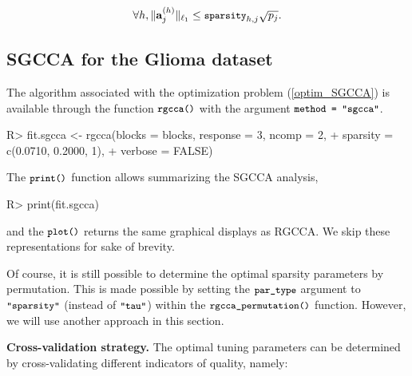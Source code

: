 \documentclass[
]{jss}
\begin{document}
\begin{equation}
\forall h, \Vert \mathbf{a}_j^{(h)} \Vert_{\ell_1} \leq \small{\texttt{sparsity}}_{h,j} \sqrt{p_j}.
\end{equation}

\hypertarget{sgcca-for-the-glioma-dataset}{%
\subsection{SGCCA for the Glioma
dataset}\label{sgcca-for-the-glioma-dataset}}

The algorithm associated with the optimization problem
(\ref{optim_SGCCA}) is available through the function
\(\small{\texttt{rgcca()}}\) with the argument
\(\small{\texttt{method = "sgcca"}}\).

\footnotesize

\begin{CodeChunk}
\begin{CodeInput}
R> fit.sgcca <- rgcca(blocks = blocks, response = 3, ncomp = 2,
+                    sparsity = c(0.0710, 0.2000, 1),
+                    verbose = FALSE)
\end{CodeInput}
\end{CodeChunk}

\normalsize

The \(\small{\texttt{print()}}\) function allows summarizing the SGCCA
analysis,

\footnotesize

\begin{CodeChunk}
\begin{CodeInput}
R> print(fit.sgcca)
\end{CodeInput}
\end{CodeChunk}

\normalsize

and the \(\small{\texttt{plot()}}\) returns the same graphical displays
as RGCCA. We skip these representations for sake of brevity.

Of course, it is still possible to determine the optimal sparsity
parameters by permutation. This is made possible by setting the
\(\small{\texttt{par\_type}}\) argument to
\(\small{\texttt{"sparsity"}}\) (instead of \(\small{\texttt{"tau"}}\))
within the \(\small{\texttt{rgcca\_permutation()}}\) function. However,
we will use another approach in this section.

\textbf{Cross-validation strategy.} The optimal tuning parameters can be
determined by cross-validating different indicators of quality, namely:
\end{document}
